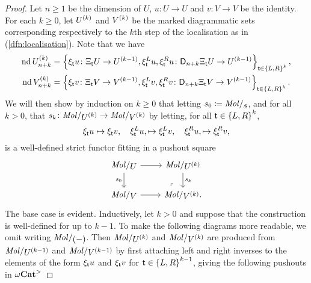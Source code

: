 \begin{proof}
    Let \( n \geq 1 \) be the dimension of \( U \), \( u \colon U \to U \) and \( v \colon V \to V \) be the identity.
    For each \( k \geq 0 \), let \( \order{k}{U} \) and \( \order{k}{V} \) be the marked diagrammatic sets corresponding respectively to the \( k \)\nbd th step of the localisation as in (\ref{dfn:localisation}).
    Note that we have
    \begin{align*}
        \nd \gr{n + k}{\order{k}{U}} &= \set{\hinv{\s}u \colon \hcyl{\s} U \to \order{k - 1}{U}, \hinv{\s}^Lu, \hinv{\s}^Ru \colon \dual{n + k}{\hcyl{\s} U} \to \order{k - 1}{U}}_{\s \in \set{L, R}^k},\\
        \nd \gr{n + k}{\order{k}{V}} &= \set{\hinv{\s}v \colon \hcyl{\s} V \to \order{k - 1}{V}, \hinv{\s}^Lv, \hinv{\s}^Rv \colon \dual{n + k}{\hcyl{\s} V} \to \order{k - 1}{V}}_{\s \in \set{L, R}^k}.
    \end{align*}
    We will then show by induction on \( k \geq 0 \) that letting \( s_0 \eqdef \molecin{s} \), and for all \( k > 0 \), that \( s_k \colon \molecin{\order{k}{U}} \to \molecin{\order{k}{V}} \) by letting, for all \( \s \in \set{L, R}^k \),
    \begin{equation*}
        \hinv{\s}u \mapsto \hinv{\s}v,\quad \hinv{\s}^Lu, \mapsto \hinv{\s}^Lv,\quad \hinv{\s}^Ru, \mapsto \hinv{\s}^Rv,
    \end{equation*}
    is a well-defined strict functor fitting in a pushout square
    \begin{equation} \label{tik:inductive_square_subdivision_localisation}
        \begin{tikzcd}
            {\molecin U} & {\molecin{\order k U}} \\
            {\molecin V} & {\molecin {\order k V}.}
            \arrow[""{name=0, anchor=center, inner sep=0}, from=1-1, to=1-2]
            \arrow["{s_0}"', from=1-1, to=2-1]
            \arrow["{s_k}", from=1-2, to=2-2]
            \arrow[from=2-1, to=2-2]
            \arrow["\lrcorner"{anchor=center, pos=0.125, rotate=180}, draw=none, from=2-2, to=0]
        \end{tikzcd}
    \end{equation}
    The base case is evident.
    Inductively, let \( k > 0 \) and suppose that the construction is well-defined for up to \( k - 1 \).
    To make the following diagrams more readable, we omit writing \( \molecin{(-)} \).
    Then \( {\molecin{\order k U}} \) and \( {\molecin{\order k V}} \) are produced from \( {\molecin{\order {k - 1} U}} \) and \( {\molecin{\order {k - 1} V}} \) by first attaching left and right inverses to the elements of the form \( \hinv{\s}u \) and \( \hinv{\s}v \) for \( \s \in \set{L, R}^{k - 1} \), giving the following pushouts in \( \somegaCat \)

\end{proof}

